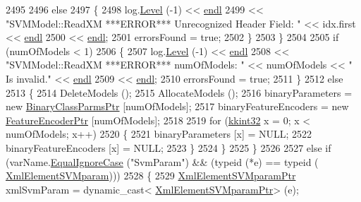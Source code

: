 \begin{DoxyCode}
2495 
2496           \textcolor{keywordflow}{else}
2497           \{
2498             log.\hyperlink{class_k_k_b_1_1_run_log_a32cf761d7f2e747465fd80533fdbb659}{Level} (-1) << \hyperlink{namespace_k_k_b_ad1f50f65af6adc8fa9e6f62d007818a8}{endl}
2499               << \textcolor{stringliteral}{"SVMModel::ReadXM   ***ERROR***   Unrecognized Header Field: "} << idx.first << 
      \hyperlink{namespace_k_k_b_ad1f50f65af6adc8fa9e6f62d007818a8}{endl}
2500               << \hyperlink{namespace_k_k_b_ad1f50f65af6adc8fa9e6f62d007818a8}{endl};
2501             errorsFound = \textcolor{keyword}{true};
2502           \}
2503         \}
2504 
2505         \textcolor{keywordflow}{if}  (numOfModels < 1)
2506         \{
2507           log.\hyperlink{class_k_k_b_1_1_run_log_a32cf761d7f2e747465fd80533fdbb659}{Level} (-1) << \hyperlink{namespace_k_k_b_ad1f50f65af6adc8fa9e6f62d007818a8}{endl}
2508             << \textcolor{stringliteral}{"SVMModel::ReadXM   ***ERROR***   numOfModels: "} << numOfModels << \textcolor{stringliteral}{" Is invalid."} << 
      \hyperlink{namespace_k_k_b_ad1f50f65af6adc8fa9e6f62d007818a8}{endl}
2509             << \hyperlink{namespace_k_k_b_ad1f50f65af6adc8fa9e6f62d007818a8}{endl};
2510           errorsFound = \textcolor{keyword}{true};
2511         \}
2512         \textcolor{keywordflow}{else}
2513         \{
2514           DeleteModels ();
2515           AllocateModels ();
2516           binaryParameters       = \textcolor{keyword}{new} \hyperlink{class_k_k_m_l_l_1_1_binary_class_parms}{BinaryClassParmsPtr} [numOfModels];
2517           binaryFeatureEncoders  = \textcolor{keyword}{new} \hyperlink{class_k_k_m_l_l_1_1_feature_encoder}{FeatureEncoderPtr}   [numOfModels];
2518 
2519           \textcolor{keywordflow}{for}  (\hyperlink{namespace_k_k_b_a8fa4952cc84fda1de4bec1fbdd8d5b1b}{kkint32} x = 0;  x < numOfModels;  x++)
2520           \{
2521             binaryParameters       [x] = NULL;
2522             binaryFeatureEncoders  [x] = NULL;
2523           \}
2524         \}
2525       \}
2526 
2527       \textcolor{keywordflow}{else} \textcolor{keywordflow}{if}  (varName.\hyperlink{class_k_k_b_1_1_k_k_str_a562f9696417c53f66bc4088eac072ab5}{EqualIgnoreCase} (\textcolor{stringliteral}{"SvmParam"})  &&  (\textcolor{keyword}{typeid} (*e) == \textcolor{keyword}{typeid} (
      \hyperlink{namespace_k_k_m_l_l_a5ddff9706fdda9d572717e645b404bf1}{XmlElementSVMparam})))
2528       \{
2529         \hyperlink{class_k_k_b_1_1_xml_element_template}{XmlElementSVMparamPtr} xmlSvmParam = \textcolor{keyword}{dynamic\_cast<}
      \hyperlink{class_k_k_b_1_1_xml_element_template}{XmlElementSVMparamPtr}\textcolor{keyword}{>} (e);

\end{DoxyCode}
